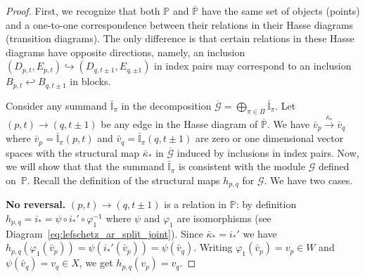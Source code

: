 \documentclass[10pt,a4paper]{amsart}
\newcommand\michal[1]{\textcolor{ForestGreen}{[ML: #1]}}
\renewcommand{\phi}{\varphi}
\begin{document}
\begin{proof}
    First, we recognize that both $\mathbb{P}$ and $\mathbb{\overline{P}}$ have the same 
    set of objects (points) and a one-to-one correspondence between their relations in their
    Hasse diagrams (transition diagrams). The only difference is that certain relations in these
    Hasse diagrams have opposite directions, namely, an inclusion $(D_{p,t},E_{p,t})\hookrightarrow (D_{q,t\pm 1},E_{q,\pm 1})$ in index pairs may correspond to an inclusion $B_{p,t}\hookleftarrow B_{q,t\pm 1}$ in blocks.

    Consider any summand $\bar{\mathbb{I}}_\pi$ in the decomposition $\overline{\mathcal G}=\bigoplus_{\pi\in \overline{\Pi}} \bar{\mathbb{I}}_{\pi}$. Let $(p,t)\rightarrow (q,t\pm 1)$ be
    any edge in the Hasse diagram of $\overline{\mathbb{P}}$. 
    We have $\bar v_p\stackrel{\bar\kappa_\ast}{\rightarrow}\bar v_q$
    where $\bar v_p=\bar{\mathbb{I}}_\pi(p,t)$ and $\bar v_q=\bar{\mathbb{I}}_\pi(q,t\pm 1)$ are zero or one dimensional vector spaces with the structural map $\bar\kappa_\ast$ in $\overline{\mathcal G}$
        induced by inclusions in index pairs. 
    Now, we will show that that the summand $\bar{\mathbb{I}}_\pi$ is consistent with the module $\mathcal G$ defined on~$\mathbb{P}$. 
    Recall the definition of the structural maps $h_{p,q}$ for $\mathcal G$. We have two cases.

    \textbf{No reversal.} $(p,t)\rightarrow (q,t\pm 1)$ is
    a relation in $\mathbb P$: by definition 
        $h_{p,q}= i_\ast=\psi\circ i_\ast'\circ\phi_1^{-1}$
    where $\psi$ and $\phi_1$ are isomorphisms (see Diagram~\ref{eq:lefschetz_ar_split_joint}).
    Since $\bar{\kappa}_\ast=i_\ast'$ we have $h_{p,q}(\phi_1(\bar v_p))=\psi(i_\ast'(\bar v_p))=\psi(\bar v_q)$.
    Writing
    $\phi_1(\bar v_p)=v_p\in W$ and $\psi(\bar v_q)=v_q\in  X$, we get $h_{p,q}(v_p)=v_q$.


\end{proof}
\end{document}
